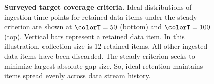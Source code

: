 \begin{figure}
\begin{minipage}[t]{0.6\textwidth}
    \begin{minipage}[]{\textwidth}
    \noindent{}%
    \hspace{-1.5ex}%
    {\vrule width 1pt}%
    \noindent{}%
    \end{minipage}
\end{minipage}%
\begin{minipage}[t]{0.4\textwidth}
    \caption{%
      \textbf{Surveyed target coverage criteria.}
      \footnotesize
      Ideal distributions of ingestion time points for retained data items under the steady criterion are shown at $\colorT=50$ (bottom) and $\colorT=100$ (top).
      Vertical bars represent a retained data item.
      In this illustration, collection size is 12 retained items.
      All other ingested data items have been discarded.
      The steady criterion seeks to minimize largest absolute gap size.
      So, ideal retention maintains items spread evenly across data stream history.
      }
    \label{fig:criteria-intuition}
\end{minipage}
\end{figure}
